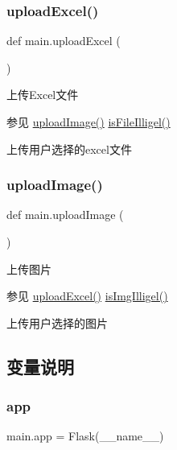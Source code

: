 \subsubsection{\texorpdfstring{uploadExcel()}{uploadExcel()}}
{\footnotesize\ttfamily def main.\+upload\+Excel (\begin{DoxyParamCaption}{ }\end{DoxyParamCaption})}



上传\+Excel文件 

\begin{DoxySeeAlso}{参见}
\mbox{\hyperlink{namespacemain_a3b88a9c9308bfa2308ae6cf744a63e4c}{upload\+Image()}} \mbox{\hyperlink{namespacemain_ab4bfdca65955984f28c72a5d0daec565}{is\+File\+Illigel()}}
\end{DoxySeeAlso}
上传用户选择的excel文件 \mbox{\label{namespacemain_a3b88a9c9308bfa2308ae6cf744a63e4c}} 
\subsubsection{\texorpdfstring{uploadImage()}{uploadImage()}}
{\footnotesize\ttfamily def main.\+upload\+Image (\begin{DoxyParamCaption}{ }\end{DoxyParamCaption})}



上传图片 

\begin{DoxySeeAlso}{参见}
\mbox{\hyperlink{namespacemain_a7f709147939b2c6005d8efdddff85f7b}{upload\+Excel()}} \mbox{\hyperlink{namespacemain_a0deb3fcf5caed9b545bb317bc0f2486f}{is\+Img\+Illigel()}}
\end{DoxySeeAlso}
上传用户选择的图片 

\subsection{变量说明}
\mbox{\label{namespacemain_a03b6adcdf574a0b20c970691677129e0}} 
\subsubsection{\texorpdfstring{app}{app}}
{\footnotesize\ttfamily main.\+app = Flask(\+\_\+\+\_\+name\+\_\+\+\_\+)}



